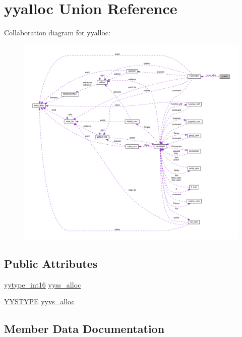 \hypertarget{unionyyalloc}{}\section{yyalloc Union Reference}
\label{unionyyalloc}


Collaboration diagram for yyalloc\+:
\nopagebreak
\begin{figure}[H]
\begin{center}
\leavevmode
\includegraphics[width=350pt]{unionyyalloc__coll__graph}
\end{center}
\end{figure}
\subsection*{Public Attributes}
\begin{DoxyCompactItemize}
\item 
\hyperlink{y_8tab_8c_ade5b97f0021a4f6c5922ead3744ab297}{yytype\+\_\+int16} \hyperlink{unionyyalloc_a4800e0520a89a4789afa7b5d82197e65}{yyss\+\_\+alloc}
\item 
\hyperlink{unionYYSTYPE}{Y\+Y\+S\+T\+Y\+PE} \hyperlink{unionyyalloc_a9326f4fdc6f737a929444427836d8928}{yyvs\+\_\+alloc}
\end{DoxyCompactItemize}


\subsection{Member Data Documentation}

